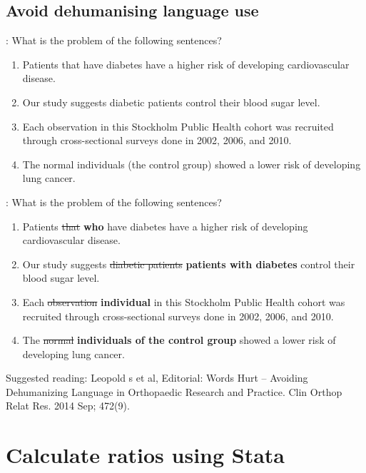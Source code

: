\subsection{Avoid dehumanising language use}
\begin{frame}{\secname: \subsecname}
	What is the problem of the following sentences?
	\begin{enumerate}
	\item Patients that have diabetes have a higher risk of developing cardiovascular disease.
	\item<2|handout:2-> Our study suggests diabetic patients control their blood sugar level.
	\item<3|handout:3-> Each observation in this Stockholm Public Health cohort was recruited through cross-sectional surveys done in 2002, 2006, and 2010.
	\item<4|handout:4-> The normal individuals (the control group) showed a lower risk of developing lung cancer. 
	\end{enumerate}

\end{frame}

\begin{frame}{\secname: \subsecname}
	What is the problem of the following sentences?
	\begin{enumerate}
	\item Patients \st{that} \textbf{who} have diabetes have a higher risk of developing cardiovascular disease.
	\item<2|handout:2-> Our study suggests \st{diabetic patients} \textbf{patients with diabetes} control their blood sugar level.
	\item<3|handout:3-> Each \st{observation} \textbf{individual} in this Stockholm Public Health cohort was recruited through cross-sectional surveys done in 2002, 2006, and 2010.
	\item<4|handout:4-> The \st{normal} \textbf{individuals of the control group} showed a lower risk of developing lung cancer. 
	\end{enumerate}

Suggested reading: Leopold s et al, Editorial: Words Hurt – Avoiding Dehumanizing Language in Orthopaedic Research and Practice. Clin Orthop Relat Res. 2014 Sep; 472(9). \cite{Leopold2014}

\end{frame}


\section{Calculate ratios using Stata}
